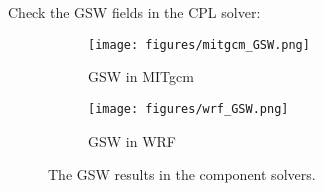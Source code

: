 
Check the GSW fields in the CPL solver:

\begin{figure}[h!]
\centering
  \begin{subfigure}[b]{0.4\linewidth}
  \texttt{[image: figures/mitgcm\_GSW.png]}
  \caption{GSW in MITgcm}
  \end{subfigure}
  \begin{subfigure}[b]{0.4\linewidth}
  \texttt{[image: figures/wrf\_GSW.png]}
  \caption{GSW in WRF}
  \end{subfigure}
\caption{The GSW results in the component solvers.}
\label{fig:gsw}
\end{figure}
